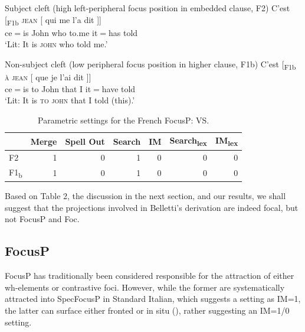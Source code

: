 \documentclass[fleqn,10pt]{wlscirep}
\begin{document}
\begin{exe}
    \ex	Subject cleft (high left-peripheral focus position in embedded clause, F2)
        \gll {[} C'est {[}\textsubscript{F1b} \textsc{jean} {[} qui me l'a dit {]]}\\
        {} ce$=$is  {}		John	{}	who to.me it$=$has told {}\\
        \vspace*{-3mm}
        \glt ‘Lit: It is \textsc{john} who told me.’
\end{exe}

\begin{exe}
    \ex	Non-subject cleft (low peripheral focus position in higher clause, F1b)
        \gll {[} C'est {[}\textsubscript{F1b} \textsc{à} \textsc{jean} {[} que je l'ai dit {]]}\\
        {} ce$=$is 		{}	to John			{}		that I it$=$have told {} \\
        \vspace*{-3mm}
        \glt ‘Lit: It is \textsc{to john} that I told (this).’
\end{exe}


\begin{table}[H]
    \centering
    \begin{tabular}{|l|r|r|r|r|r|r|}
    \hline
    & Merge & Spell Out & Search & IM & Search\textsubscript{lex} & IM\textsubscript{lex} \\
    \hline
    F2 & 1 & 0 & 1 & 0 & 0 & 0 \\
    \hline
    F1\textsubscript{b} & 1 & 0 & 1 & 0 & 0 & 0 \\
    \hline
    \end{tabular}
    \caption{\label{tab:belletti}Parametric settings for the French FocusP: VS.}
\end{table}

\noindent Based on Table 2, the discussion in the next section, and our results, we shall suggest that the projections involved in Belletti's derivation are indeed focal, but not FocusP and Foc.

\subsection*{FocusP}

FocusP has traditionally been considered responsible for the attraction of either wh-elements or contrastive foci. 
However, while the former are systematically attracted into SpecFocusP in Standard Italian, which suggests a setting as IM=1, the latter can surface either fronted or in situ (\citealt{bianchi2013}), rather suggesting an IM=1/0 setting. 
\end{document}
